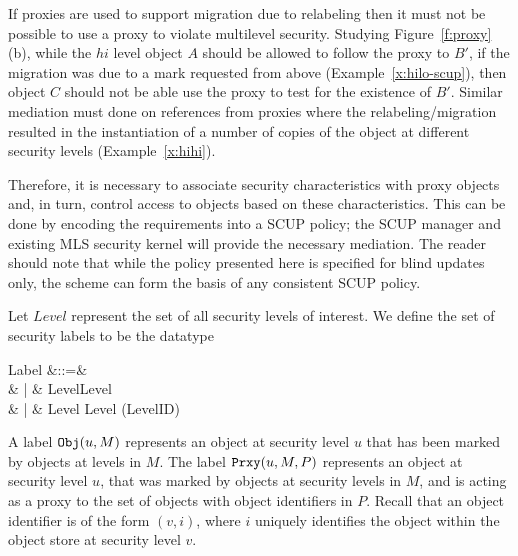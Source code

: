 If proxies are used to support migration due to relabeling then it must
not be possible to use a proxy to violate multilevel security.
Studying Figure~\ref{f:proxy}(b), while the $hi$ level object $A$ should be
allowed to follow the proxy to $B'$, if the migration was due to a mark
requested from above (Example~\ref{x:hilo-scup}), then object $C$
should not be able use the proxy to test for the existence of $B'$.
Similar mediation must done on references from proxies where the
relabeling/migration resulted in the instantiation of a number of
copies of the object  at different security levels (Example~\ref{x:hihi}).
 
Therefore, it is necessary to associate security characteristics 
with proxy objects and, in turn, control access to 
objects based on these characteristics. This can be done
 by encoding the requirements 
into a SCUP policy; the SCUP manager and existing MLS
security kernel will provide the necessary mediation. 
The reader should note that while 
the  policy presented here is specified for blind updates only, 
 the scheme can form the basis of any consistent SCUP policy. 

Let $Level$ represent the set of all security levels of interest. 
We define the set of security labels to be the datatype
\begin{syntax}
Label &::=& \Invisible \\
      & | & \Object \ldata Level\cross \power Level \rdata \\
      & | & \Proxy \ldata Level \cross 
                         \power Level \cross (Level\pfun ID) \rdata
\end{syntax}
A label $\mbox{\tt Obj}(u,M)$ represents an object at security level $u$ that 
has been marked by objects at levels in $M$. 
The label $\mbox{\tt Prxy}(u,M,P)$ represents an object at security level 
$u$, that was marked by objects at security levels in $M$, and 
is acting as a proxy to the set of objects with 
object identifiers in $P$. Recall that an object identifier is 
of the form $(v,i)$, where $i$ uniquely identifies the object within
the object store at security level $v$. 

